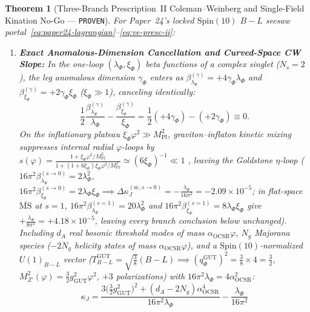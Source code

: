 \documentclass[11pt,a4paper]{article}
\newtheorem{theorem}{Theorem}
\begin{document}
\begin{theorem}[Three-Branch Prescription~II Coleman--Weinberg and Single-Field Kination No-Go --- \textnormal{{\upshape\texttt{PROVEN}}}]
\label{thm:uv-nogo}
For Paper~24's locked $\mathrm{Spin}(10)$ $B-L$ seesaw portal~\eqref{eq:paper24-lagrangian}--\eqref{eq:ve-presc-ii}:
\begin{enumerate}
  \item \textbf{Exact Anomalous-Dimension Cancellation and Curved-Space CW Slope:} In the one-loop $(\lambda_\Phi,\xi_\Phi)$ beta functions of a complex singlet ($N_s = 2$), the leg anomalous dimension $\gamma_\Phi$ enters as $\beta_{\lambda_\Phi}^{(\gamma)} = +4\gamma_\Phi\lambda_\Phi$ and $\beta_{\xi_\Phi}^{(\gamma)} = +2\gamma_\Phi\xi_\Phi$ ($\xi_\Phi \gg 1$), canceling identically:
  \begin{equation}
    \frac{1}{2}\frac{\beta_{\lambda_\Phi}^{(\gamma)}}{\lambda_\Phi} - \frac{\beta_{\xi_\Phi}^{(\gamma)}}{\xi_\Phi} = \frac{1}{2}(+4\gamma_\Phi) - (+2\gamma_\Phi) \equiv 0.
    \label{eq:gamma-cancellation}
  \end{equation}
  On the inflationary plateau $\xi_\Phi\varphi^2 \gg M_{\mathrm{Pl}}^2$, graviton--inflaton kinetic mixing suppresses internal radial $\varphi$-loops by $s(\varphi) = \frac{1 + \xi_\Phi\varphi^2/M_{\mathrm{Pl}}^2}{1 + (1 + 6\xi_\Phi)\xi_\Phi\varphi^2/M_{\mathrm{Pl}}^2} \simeq (6\xi_\Phi)^{-1} \ll 1$ \cite{DeSimone2009}, leaving the Goldstone $\eta$-loop ($16\pi^2\beta_{\lambda_\Phi}^{(s\to 0)} = 2\lambda_\Phi^2$, $16\pi^2\beta_{\xi_\Phi}^{(s\to 0)} = 2\lambda_\Phi\xi_\Phi \implies \Delta\kappa_J^{(\mathrm{sc},s\to 0)} = -\frac{\lambda_\Phi}{16\pi^2} = -2.09\times 10^{-5}$; in flat-space $\overline{\mathrm{MS}}$ at $s = 1$, $16\pi^2\beta_{\lambda_\Phi}^{(s=1)} = 20\lambda_\Phi^2$ and $16\pi^2\beta_{\xi_\Phi}^{(s=1)} = 8\lambda_\Phi\xi_\Phi$ give $+\frac{\lambda_\Phi}{8\pi^2} = +4.18\times 10^{-5}$, leaving every branch conclusion below unchanged). Including $d_A$ real bosonic threshold modes of mass $\alpha_{\mathrm{OCSR}}\varphi$, $N_g$ Majorana species ($-2N_g$ helicity states of mass $\alpha_{\mathrm{OCSR}}\varphi$), and a $\mathrm{Spin}(10)$-normalized $U(1)_{B-L}$ vector ($T_{B-L}^{\mathrm{GUT}} = \sqrt{\frac{3}{8}}(B-L) \implies (q_\Phi^{\mathrm{GUT}})^2 = \frac{3}{8}\times 4 = \frac{3}{2}$, $M_{Z'}^2(\varphi) = \frac{3}{2}g_{\mathrm{GUT}}^2\varphi^2$, $+3$ polarizations) with $16\pi^2\lambda_\Phi = 4\alpha_{\mathrm{OCSR}}^2$:
  \begin{equation}
    \kappa_J = \frac{3\bigl(\frac{3}{2}g_{\mathrm{GUT}}^2\bigr)^2 + (d_A - 2N_g)\alpha_{\mathrm{OCSR}}^4}{16\pi^2\lambda_\Phi} - \frac{\lambda_\Phi}{16\pi^2}

\end{equation}
\end{enumerate}
\end{theorem}
\end{document}
